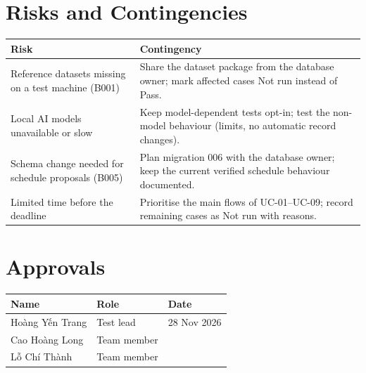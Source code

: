 \documentclass[10pt,letterpaper]{article}
\begin{document}
\section{Risks and Contingencies}
\begin{longtable}{|L{5.5cm}|L{10.0cm}|}
\hline \textbf{Risk} & \textbf{Contingency}\\ \hline \endhead
Reference datasets missing on a test machine (B001) & Share the dataset package from the database owner; mark affected cases Not run instead of Pass.\\ \hline
Local AI models unavailable or slow & Keep model-dependent tests opt-in; test the non-model behaviour (limits, no automatic record changes).\\ \hline
Schema change needed for schedule proposals (B005) & Plan migration 006 with the database owner; keep the current verified schedule behaviour documented.\\ \hline
Limited time before the deadline & Prioritise the main flows of UC-01--UC-09; record remaining cases as Not run with reasons.\\ \hline
\end{longtable}

\section{Approvals}
\begin{tabularx}{\textwidth}{|Y|L{4cm}|L{3cm}|}
\hline \textbf{Name} & \textbf{Role} & \textbf{Date}\\ \hline
Hoàng Yến Trang & Test lead & 28 Nov 2026\\ \hline
Cao Hoàng Long & Team member & \\ \hline
Lỗ Chí Thành & Team member & \\ \hline
\end{tabularx}
\end{document}
